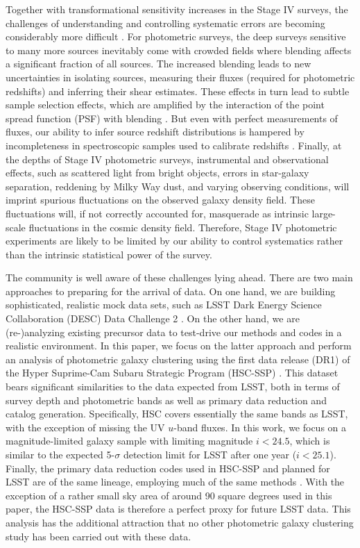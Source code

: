 \documentclass[a4paper,11pt]{article}
\begin{document}
  Together with transformational sensitivity increases in the Stage IV surveys, the challenges of understanding and controlling systematic errors are becoming considerably more difficult \cite{1808.07335}. For photometric surveys, the deep surveys sensitive to many more sources inevitably come with crowded fields where blending affects a significant fraction of all sources. The increased blending leads to new uncertainties in isolating sources, measuring their fluxes (required for photometric redshifts) and inferring their shear estimates. These effects in turn lead to subtle sample selection effects, which are amplified by the interaction of the point spread function (PSF) with blending \cite{1708.01533,1905.01324,1907.10572}. But even with perfect measurements of fluxes, our ability to infer source redshift distributions is hampered by incompleteness in spectroscopic samples used to calibrate redshifts \cite{1903.09325}. Finally, at the depths of Stage IV photometric surveys, instrumental and observational effects, such as scattered light from bright objects, errors in star-galaxy separation, reddening by Milky Way dust, and varying observing conditions, will imprint spurious fluctuations on the observed galaxy density field. These fluctuations will, if not correctly accounted for, masquerade as intrinsic large-scale fluctuations in the cosmic density field. Therefore, Stage IV photometric experiments are likely to be limited by our ability to control systematics rather than the intrinsic statistical power of the survey.

  The community is well aware of these challenges lying ahead. There are two main approaches to preparing for the arrival of data. On one hand, we are building sophisticated, realistic mock data sets, such as LSST Dark Energy Science Collaboration (DESC) Data Challenge 2 \cite{1909.07340,1907.06530}. On the other hand, we are (re-)analyzing existing precursor data to test-drive our methods and codes in a realistic environment. In this paper, we focus on the latter approach and perform an analysis of photometric galaxy clustering using the first data release (DR1) of the Hyper Suprime-Cam Subaru Strategic Program (HSC-SSP) \cite{2018PASJ...70S...8A}. This dataset bears significant similarities to the data expected from LSST, both in terms of survey depth and photometric bands as well as primary data reduction and catalog generation. Specifically, HSC covers essentially the same bands as LSST, with the exception of missing the UV $u$-band fluxes. In this work, we focus on a magnitude-limited galaxy sample with limiting magnitude $i<24.5$, which is similar to the expected 5-$\sigma$ detection limit for LSST after one year \cite{1809.01669} ($i<25.1$). Finally, the primary data reduction codes used in HSC-SSP and planned for LSST are of the same lineage, employing much of the same methods \cite{2018PASJ...70S...5B,1812.03248}. With the exception of a rather small sky area of around 90 square degrees used in this paper, the HSC-SSP data is therefore a perfect proxy for future LSST data. This analysis has the additional attraction that no other photometric galaxy clustering study has been carried out with these data.
\end{document}
